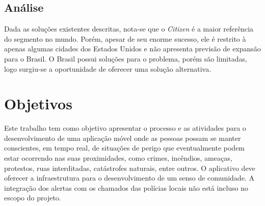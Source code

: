 \subsection{Análise}

Dada as soluções existentes descritas, nota-se que o \emph{Citizen} é a maior referência do segmento no mundo. Porém, apesar de seu enorme sucesso, ele é restrito à apenas algumas cidades dos Estados Unidos e não apresenta previsão de expansão para o Brasil. O Brasil possui soluções para o problema, porém são limitadas, logo surgiu-se a oportunidade de oferecer uma solução alternativa.

\section{Objetivos}



Este trabalho tem como objetivo apresentar o processo e as atividades para o desenvolvimento de uma aplicação móvel onde as pessoas possam se manter conscientes, em tempo real, de situações de perigo que eventualmente podem estar ocorrendo nas suas proximidades, como crimes, incêndios, ameaças, protestos, ruas interditadas, catástrofes naturais, entre outros. O aplicativo deve oferecer a infraestrutura para o desenvolvimento de um senso de comunidade. A integração dos alertas com os chamados das polícias locais não está incluso no escopo do projeto.
